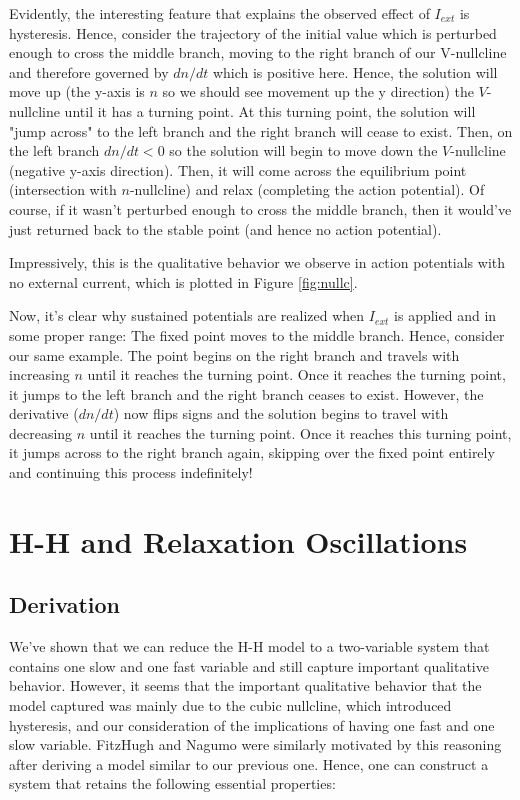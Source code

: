 \documentclass{article}
\begin{document}
Evidently, the interesting feature that explains the observed effect of $I_{ext}$ is hysteresis. Hence, consider the trajectory of the initial value which is perturbed enough to cross the middle branch, moving to the right branch of our V-nullcline and therefore governed by $dn/dt$ which is positive here. Hence, the solution will move up (the y-axis is $n$ so we should see movement up the y direction) the $V$-nullcline until it has a turning point. At this turning point, the solution will "jump across" to the left branch and the right branch will cease to exist. Then, on the left branch $dn/dt<0$ so the solution will begin to move down the $V$-nullcline (negative y-axis direction). Then, it will come across the equilibrium point (intersection with $n$-nullcline) and relax (completing the action potential). Of course, if it wasn't perturbed enough to cross the middle branch, then it would've just returned back to the stable point (and hence no action potential).

Impressively, this is the qualitative behavior we observe in action potentials with no external current, which is plotted in Figure \ref{fig:nullc}.

Now, it's clear why sustained potentials are realized when $I_{ext}$ is applied and in some proper range: The fixed point moves to the middle branch. Hence, consider our same example. The point begins on the right branch and travels with increasing $n$ until it reaches the turning point. Once it reaches the turning point, it jumps to the left branch and the right branch ceases to exist. However, the derivative ($dn/dt$) now flips signs and the solution begins to travel with decreasing $n$ until it reaches the turning point. Once it reaches this turning point, it jumps across to the right branch again, skipping over the fixed point entirely and continuing this process indefinitely!

\section{H-H and Relaxation Oscillations}

\subsection{Derivation}

We've shown that we can reduce the H-H model to a two-variable system that contains one slow and one fast variable and still capture important qualitative behavior. However, it seems that the important qualitative behavior that the model captured was mainly due to the cubic nullcline, which introduced hysteresis, and our consideration of the implications of having one fast and one slow variable. FitzHugh and Nagumo were similarly motivated by this reasoning after deriving a model similar to our previous one\cite{keener}. Hence, one can construct a system that retains the following essential properties:
\end{document}
